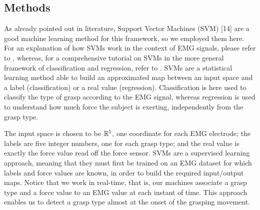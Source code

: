 \subsection{Methods}

As already pointed out in literature, Support Vector Machines (SVM)
[14] are a good machine learning method for this framework, so we
employed them here. For an explanation of how SVMs work in the context
of EMG signals, please refer to \cite{2008.ICRA,2008.BioCyb}, whereas,
for a comprehensive tutorial on SVMs in the more general framework of
classification and regression, refer to
\cite{Burges98,SmolaTut2004}. SVMs are a statistical learning method
able to build an approximated map between an input space and a label
(classification) or a real value (regression). Classification is here
used to classify the type of grasp according to the EMG signal,
whereas regression is used to understand how much force the subject is
exerting, independently from the grasp type.

The input space is chosen to be $\mathbb{R}^5$, one coordinate for each EMG
electrode; the labels are five integer numbers, one for each grasp
type; and the real value is exactly the force value read off the force
sensor. SVMs are a supervised learning approach, meaning that they
must first be trained on an EMG dataset for which labels and force
values are known, in order to build the required input/output
maps. Notice that we work in real-time, that is, our machines
associate a grasp type and a force value to an EMG value at each
instant of time. This approach enables us to detect a grasp type
almost at the onset of the grasping movement.
